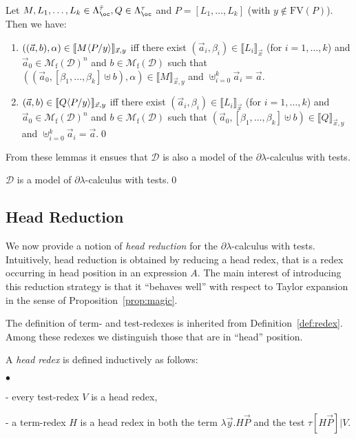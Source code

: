 \documentclass{LMCS}
\newcommand{\dlam}{\ensuremath{\partial\lambda}}
\newcommand{\lam}{\ensuremath{\lambda}}
\newcommand{\bang}{\oc}
\newcommand{\paral}{\vert}
\newcommand{\FV}{\mathrm{FV}}
\newcommand{\FSet}[1]{\Lambda^{#1}_{\bang}}
\newcommand{\Int}[1]{\llbracket #1\rrbracket} \newcommand{\trm}[1]{#1^{\textrm{--}}}
\newcommand{\Mfin}[1]{\mathcal{M}_{\mathrm{f}}(#1)}
\newcommand{\mcup}{\uplus}
\newcommand{\seq}[1]{\vec{#1}}
\newcommand{\gt}{\ensuremath{\tau}}
\newcommand{\gto}{\ensuremath{\bar\tau}}
\newcommand{\cD}{\mathcal{D}}
\begin{document}
\begin{lem}
Let $M,L_1,\dots,L_k\in\FSet{\gto}, Q\in\FSet{\gt}$ and $P = [L_1,\ldots,L_k]$ (with $y \not\in \FV(P)$). Then we have:
\begin{enumerate}[\em(i)]
\item 
$((\seq a,b),\alpha)\in \Int{M\lsubst{y}{P}}_{\seq x,y}$ iff there exist
$(\seq a_i,\beta_i)\in\Int{L_i}_{\seq x}$ (for $i=1,\ldots,k$) and
$\seq a_0\in\Mfin{\cD}^n$ and $b \in\Mfin{\cD}$ such that
$((\seq a_0,[\beta_1,\ldots,\beta_k] \mcup b), \alpha)\in\Int{M}_{\seq x,y}$
and 
$\mcup_{i=0}^{k} \seq a_i=\seq a$.
\item 
$(\seq a,b) \in \Int{Q\lsubst{y}{P}}_{\seq x,y}$  iff there exist
$(\seq a_i,\beta_i)\in\Int{L_i}_{\seq x}$ (for $i=1,\ldots,k$) and
$\seq a_0\in\Mfin{\cD}^n$ and $b \in\Mfin{\cD}$ such that
$(\seq a_0,[\beta_1,\ldots,\beta_k]\mcup b)\in\Int{Q}_{\seq x,y}$ and 
$\mcup_{i=0}^{k} \seq a_i=\seq a$.\qed
\end{enumerate}
\end{lem}



\noindent From these lemmas it ensues that $\cD$ is also a model of the \dlam-calculus with tests.

\begin{thm}
$\cD$ is a  model of \dlam-calculus with tests.\qed
\end{thm}

\subsection{Head Reduction}\label{subsec:HeadRed}

We now provide a notion of \emph{head reduction} for the \dlam-calculus with tests.
Intuitively, head reduction is obtained by reducing a head redex, 
that is a redex occurring in head position in an expression $A$.
The main interest of introducing this reduction strategy is that 
it ``behaves well'' with respect to Taylor expansion 
in the sense of Proposition~\ref{prop:magic}.


The definition of term- and test-redexes is inherited from Definition~\ref{def:redex}.
Among these redexes we distinguish those that are in ``head'' position. 

\begin{defi}\label{def:head-redex}
A \emph{head redex} is defined inductively as follows: 
\begin{iteMize}{$\bullet$} 
\item[-]
        every test-redex $V$ is a head redex,
\item[-] 
	a term-redex $H$ is a head redex in both the term $\lam\seq y.H\seq P$ and the test $\gt[H\seq P]\paral V$.
\end{iteMize}
\end{defi}
\end{document}
